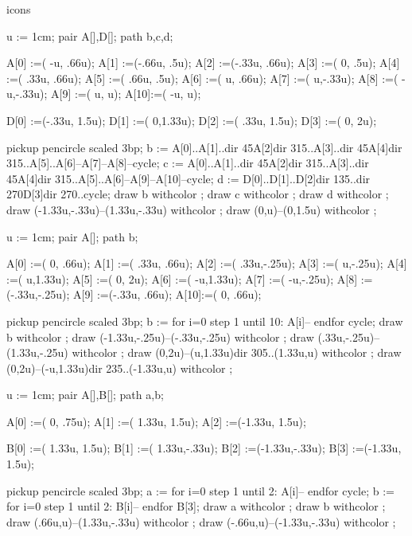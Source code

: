 \startenvironment icons

u := 1cm;
pair A[],D[];
path b,c,d;

A[0] :=(   -u, .66u);
A[1] :=(-.66u,  .5u);
A[2] :=(-.33u, .66u);
A[3] :=(    0,  .5u);
A[4] :=( .33u, .66u);
A[5] :=( .66u,  .5u);
A[6] :=(    u, .66u);
A[7] :=(    u,-.33u);
A[8] :=(   -u,-.33u);
A[9] :=(    u,    u);
A[10]:=(   -u,    u);

D[0] :=(-.33u, 1.5u);
D[1] :=(    0,1.33u);
D[2] :=( .33u, 1.5u);
D[3] :=(    0,   2u);

pickup pencircle scaled 3bp;
b := A[0]..A[1]..{dir 45}A[2]{dir 315}..A[3]..{dir 45}A[4]{dir 315}..A[5]..A[6]--A[7]--A[8]--cycle;
c := A[0]..A[1]..{dir 45}A[2]{dir 315}..A[3]..{dir 45}A[4]{dir 315}..A[5]..A[6]--A[9]--A[10]--cycle;
d := D[0]..D[1]..D[2]{dir 135}..{dir 270}D[3]{dir 270}..cycle;
draw b withcolor ;
draw c withcolor ;
draw d withcolor ;
draw (-1.33u,-.33u)--(1.33u,-.33u) withcolor ;
draw (0,u)--(0,1.5u) withcolor ;
\stopreusableMPgraphic

u := 1cm;
pair A[];
path b;

A[0] :=(    0, .66u);
A[1] :=( .33u, .66u);
A[2] :=( .33u,-.25u);
A[3] :=(    u,-.25u);
A[4] :=(    u,1.33u);
A[5] :=(    0,   2u);
A[6] :=(   -u,1.33u);
A[7] :=(   -u,-.25u);
A[8] :=(-.33u,-.25u);
A[9] :=(-.33u, .66u);
A[10]:=(    0, .66u);

pickup pencircle scaled 3bp;
b := for i=0 step 1 until 10:
	A[i]--
endfor cycle;
draw b withcolor ;
draw (-1.33u,-.25u)--(-.33u,-.25u) withcolor ;
draw (.33u,-.25u)--(1.33u,-.25u) withcolor ;
draw (0,2u)--(u,1.33u){dir 305}..(1.33u,u) withcolor ;
draw (0,2u)--(-u,1.33u){dir 235}..(-1.33u,u) withcolor ;
\stopreusableMPgraphic

u := 1cm;
pair A[],B[];
path a,b;

A[0] :=(     0, .75u);
A[1] :=( 1.33u, 1.5u);
A[2] :=(-1.33u, 1.5u);

B[0] :=( 1.33u, 1.5u);
B[1] :=( 1.33u,-.33u);
B[2] :=(-1.33u,-.33u);
B[3] :=(-1.33u, 1.5u);

pickup pencircle scaled 3bp;
a := for i=0 step 1 until 2:
	A[i]--
endfor cycle;
b := for i=0 step 1 until 2:
	B[i]--
endfor B[3];
draw a withcolor ;
draw b withcolor ;
draw (.66u,u)--(1.33u,-.33u) withcolor ;
draw (-.66u,u)--(-1.33u,-.33u) withcolor ;
\stopreusableMPgraphic

